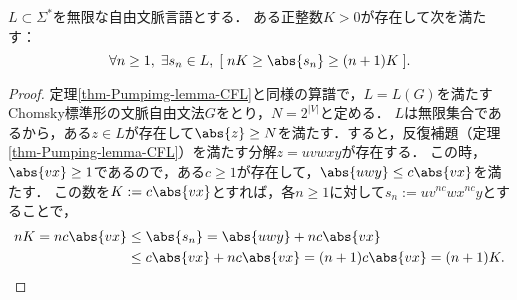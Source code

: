 \begin{corollary}\label{cor-pumping-lemma}
    $L\subset\Sigma^*$を無限な自由文脈言語とする．
    ある正整数$K>0$が存在して次を満たす：
    \[\forall n\ge 1,\;\exists s_n\in L,\;[\;nK\ge\abs{s_n}\ge(n+1)K\;].\]
\end{corollary}
\begin{proof}
    定理\ref{thm-Pumpimg-lemma-CFL}と同様の算譜で，$L=L(G)$を満たすChomsky標準形の文脈自由文法$G$をとり，$N=2^{|V|}$と定める．
    $L$は無限集合であるから，ある$z\in L$が存在して$\abs{z}\ge N$を満たす．すると，反復補題（定理\ref{thm-Pumping-lemma-CFL}）を満たす分解$z=uvwxy$が存在する．
    この時，$\abs{vx}\ge 1$であるので，ある$c\ge 1$が存在して，$\abs{uwy}\le c\abs{vx}$を満たす．
    この数を$K:=c\abs{vx}$とすれば，各$n\ge 1$に対して$s_n:=uv^{nc}wx^{nc}y$とすることで，
    \begin{align*}
        nK= nc\abs{vx}&\le \abs{s_n}=\abs{uwy}+nc\abs{vx}\\
        &\le c\abs{vx}+nc\abs{vx}=(n+1)c\abs{vx}=(n+1)K.
    \end{align*}
\end{proof}

